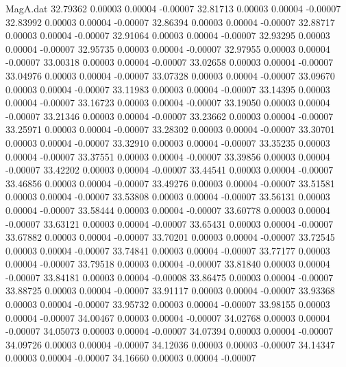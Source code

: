\begin{filecontents}{MagA.dat}
  32.79362    0.00003    0.00004   -0.00007
  32.81713    0.00003    0.00004   -0.00007
  32.83992    0.00003    0.00004   -0.00007
  32.86394    0.00003    0.00004   -0.00007
  32.88717    0.00003    0.00004   -0.00007
  32.91064    0.00003    0.00004   -0.00007
  32.93295    0.00003    0.00004   -0.00007
  32.95735    0.00003    0.00004   -0.00007
  32.97955    0.00003    0.00004   -0.00007
  33.00318    0.00003    0.00004   -0.00007
  33.02658    0.00003    0.00004   -0.00007
  33.04976    0.00003    0.00004   -0.00007
  33.07328    0.00003    0.00004   -0.00007
  33.09670    0.00003    0.00004   -0.00007
  33.11983    0.00003    0.00004   -0.00007
  33.14395    0.00003    0.00004   -0.00007
  33.16723    0.00003    0.00004   -0.00007
  33.19050    0.00003    0.00004   -0.00007
  33.21346    0.00003    0.00004   -0.00007
  33.23662    0.00003    0.00004   -0.00007
  33.25971    0.00003    0.00004   -0.00007
  33.28302    0.00003    0.00004   -0.00007
  33.30701    0.00003    0.00004   -0.00007
  33.32910    0.00003    0.00004   -0.00007
  33.35235    0.00003    0.00004   -0.00007
  33.37551    0.00003    0.00004   -0.00007
  33.39856    0.00003    0.00004   -0.00007
  33.42202    0.00003    0.00004   -0.00007
  33.44541    0.00003    0.00004   -0.00007
  33.46856    0.00003    0.00004   -0.00007
  33.49276    0.00003    0.00004   -0.00007
  33.51581    0.00003    0.00004   -0.00007
  33.53808    0.00003    0.00004   -0.00007
  33.56131    0.00003    0.00004   -0.00007
  33.58444    0.00003    0.00004   -0.00007
  33.60778    0.00003    0.00004   -0.00007
  33.63121    0.00003    0.00004   -0.00007
  33.65431    0.00003    0.00004   -0.00007
  33.67882    0.00003    0.00004   -0.00007
  33.70201    0.00003    0.00004   -0.00007
  33.72545    0.00003    0.00004   -0.00007
  33.74841    0.00003    0.00004   -0.00007
  33.77177    0.00003    0.00004   -0.00007
  33.79518    0.00003    0.00004   -0.00007
  33.81840    0.00003    0.00004   -0.00007
  33.84181    0.00003    0.00004   -0.00008
  33.86475    0.00003    0.00004   -0.00007
  33.88725    0.00003    0.00004   -0.00007
  33.91117    0.00003    0.00004   -0.00007
  33.93368    0.00003    0.00004   -0.00007
  33.95732    0.00003    0.00004   -0.00007
  33.98155    0.00003    0.00004   -0.00007
  34.00467    0.00003    0.00004   -0.00007
  34.02768    0.00003    0.00004   -0.00007
  34.05073    0.00003    0.00004   -0.00007
  34.07394    0.00003    0.00004   -0.00007
  34.09726    0.00003    0.00004   -0.00007
  34.12036    0.00003    0.00003   -0.00007
  34.14347    0.00003    0.00004   -0.00007
  34.16660    0.00003    0.00004   -0.00007

\end{filecontents}
